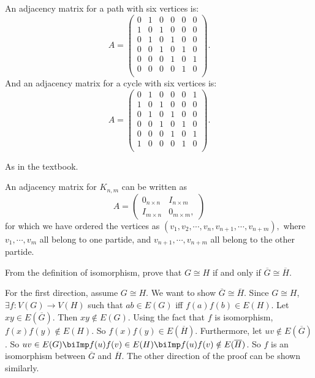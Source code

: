 \begin{solution}
	An adjacency matrix for a path with six vertices is:
	\[ A = \begin{pmatrix}
		0 & 1 & 0 & 0 & 0 & 0 \\
		1 & 0 & 1 & 0 & 0 & 0 \\
		0 & 1 & 0 & 1 & 0 & 0 \\
		0 & 0 & 1 & 0 & 1 & 0 \\
		0 & 0 & 0 & 1 & 0 & 1 \\
		0 & 0 & 0 & 0 & 1 & 0 \\
	\end{pmatrix}.
	 \]
	And an adjacency matrix for a cycle with six vertices is:
	\[ A = \begin{pmatrix}
		0 & 1 & 0 & 0 & 0 & 1 \\
		1 & 0 & 1 & 0 & 0 & 0 \\
		0 & 1 & 0 & 1 & 0 & 0 \\
		0 & 0 & 1 & 0 & 1 & 0 \\
		0 & 0 & 0 & 1 & 0 & 1 \\
		1 & 0 & 0 & 0 & 1 & 0 \\
	\end{pmatrix}.
	\]
\end{solution}

\begin{problem}
	As in the textbook.
\end{problem}
\begin{solution}
	An adjacency matrix for $ K_{n,m} $ can be written as
	\[
	A =
	\begin{pmatrix}
		0_{n \times n} & I_{n \times m} \\
		I_{m \times n} & 0_{m \times m},
	\end{pmatrix}
	\]
	for which we have ordered the vertices as $ (v_1,v_2,\cdots,v_n,v_{n+1},\cdots,v_{n+m}), $
	where $ v_1,\cdots,v_m $ all belong to one partide, and $ v_{n+1},\cdots,v_{n+m} $ all belong to the other partide.
\end{solution}


\begin{problem}
	From the definition of isomorphism, prove that $ G\cong H $ if and only if $ \overline{G} \cong \overline{H} $.
\end{problem}
\begin{solution}
	For the first direction, assume $ G \cong H $. We want to show $ \overline{G} \cong \overline{H} $. Since $ G \cong H $, $ \exists f: V(G) \to V(H) $ such that $ ab \in E(G) $ iff $ f(a)f(b) \in E(H) $. Let $ xy \in E(\overline{G}) $. Then $ xy \notin E(G) $. Using the fact that $ f $ is isomorphism, $ f(x)f(y) \notin E(H) $. So $ f(x)f(y) \in E(\overline{H}) $. Furthermore, let $ uv \notin E(\overline{G}) $. So $ uv\in E(G) \biImp f(u)f(v) \in E(H) \biImp f(u)f(v)\notin E(\overline{H})$. So $ f $ is an isomorphism between $ \overline{G} $ and $ \overline{H} $. The other direction of the proof can be shown similarly.
\end{solution}



